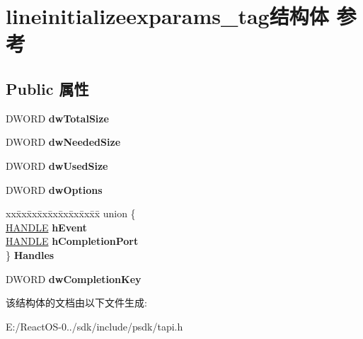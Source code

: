 \hypertarget{structlineinitializeexparams__tag}{}\section{lineinitializeexparams\+\_\+tag结构体 参考}
\label{structlineinitializeexparams__tag}
\subsection*{Public 属性}
\begin{DoxyCompactItemize}
\item 
\mbox{\label{structlineinitializeexparams__tag_a1a3788f4aab3db4e34dae725b096f15b}} 
D\+W\+O\+RD {\bfseries dw\+Total\+Size}
\item 
\mbox{\label{structlineinitializeexparams__tag_ae8f42d9d6d3b3c43e3d657c0366c6d24}} 
D\+W\+O\+RD {\bfseries dw\+Needed\+Size}
\item 
\mbox{\label{structlineinitializeexparams__tag_a0ac4265cbd46587a2238e946b37de323}} 
D\+W\+O\+RD {\bfseries dw\+Used\+Size}
\item 
\mbox{\label{structlineinitializeexparams__tag_a1fff7652d467d3f891baff9a71f799df}} 
D\+W\+O\+RD {\bfseries dw\+Options}
\item 
\mbox{\label{structlineinitializeexparams__tag_a598aaa9e5b4fe9e5b7602668c75b3694}} 
\begin{tabbing}
xx\=xx\=xx\=xx\=xx\=xx\=xx\=xx\=xx\=\kill
union \{\\
\>\hyperlink{interfacevoid}{HANDLE} {\bfseries hEvent}\\
\>\hyperlink{interfacevoid}{HANDLE} {\bfseries hCompletionPort}\\
\} {\bfseries Handles}\\

\end{tabbing}\item 
\mbox{\label{structlineinitializeexparams__tag_aeb524be95ee1d3b9d5b4246a6bab5a4b}} 
D\+W\+O\+RD {\bfseries dw\+Completion\+Key}
\end{DoxyCompactItemize}


该结构体的文档由以下文件生成\+:\begin{DoxyCompactItemize}
\item 
E\+:/\+React\+O\+S-\/0../sdk/include/psdk/tapi.\+h\end{DoxyCompactItemize}

